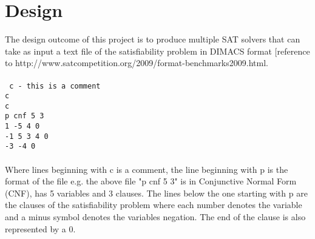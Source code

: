 \documentclass[12pt,a4paper]{article}
\begin{document}

\section{Design}
The design outcome of this project is to produce multiple SAT solvers that can take as input a text file of the satisfiability problem in DIMACS format [reference to http://www.satcompetition.org/2009/format-benchmarks2009.html. \\\\
\texttt{
c - this is a comment\\
c \\
c \\
p cnf 5 3\\
1 -5 4 0\\
-1 5 3 4 0\\
-3 -4 0\\
}\\
Where lines beginning with c is a comment, the line beginning with p is the format of the file e.g. the above file "p cnf 5 3" is in Conjunctive Normal Form (CNF), has 5 variables and 3 clauses. The lines below the one starting with p are the clauses of the satisfiability problem where each number denotes the variable and a minus symbol denotes the variables negation. The end of the clause is also represented by a 0.\\\\
\end{document}
